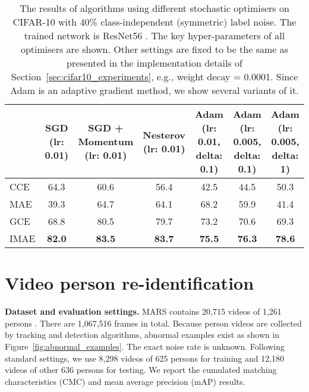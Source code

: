 \documentclass{article}
\begin{document}
\begin{table*}[!t]
\caption{
		The results of algorithms using different stochastic optimisers on CIFAR-10 with 40\% class-independent (symmetric) label noise.
		The trained network is ResNet56 \cite{he2016deep}.   
		The key hyper-parameters of all optimisers are shown. Other settings are fixed to be the same as presented in the implementation details of Section~\ref{sec:cifar10_experiments}, e.g., weight decay = 0.0001. Since Adam is an adaptive gradient method, we show several variants of it.      
	}
	\centering
	\vspace{-6pt}
	\fontsize{9pt}{9pt}\selectfont
	\setlength{\tabcolsep}{6pt} \begin{tabular}{lcccccc}
		\toprule
		& \makecell{SGD \\(lr: 0.01)} & \makecell{SGD + Momentum \\ (lr: 0.01)} & \makecell{Nesterov \\(lr: 0.01)} & \makecell{Adam \\(lr: 0.01, \\delta: 0.1)} & \makecell{Adam \\(lr: 0.005, \\delta: 0.1)} & \makecell{Adam \\(lr: 0.005, \\delta: 1)} \\
		\midrule
		CCE & 64.3 & 60.6 & 56.4 & 42.5 & 44.5 & 50.3\\
		MAE & 39.3 & 64.7 & 64.1 & 68.2 & 59.9 & 41.4\\
		GCE & 68.8 & 80.5 & 79.7 & 73.2 & 70.6 & 69.3\\
		IMAE & \textbf{82.0} & \textbf{83.5} & \textbf{83.7} & \textbf{75.5} & \textbf{76.3} & \textbf{78.6}\\
		\bottomrule
	\end{tabular}
	\label{table:stochastic_optimisers}
	\vspace{-0.2cm}
\end{table*}



\section{Video person re-identification }

\noindent
\textbf{Dataset and evaluation settings.} MARS contains 20,715 videos of 1,261 persons \cite{zheng2016mars}. 
There are 1,067,516 frames in total. 
Because person videos are collected by tracking and detection algorithms, 
abnormal examples exist as shown in Figure~\ref{fig:abnormal_examples}.
The exact noise rate is unknown.
Following standard settings, we use 8,298 videos of 625 persons for training 
and 12,180 videos of other 636 persons for testing. 
We report the cumulated matching characteristics (CMC) and mean average precision (mAP) results.
\end{document}
